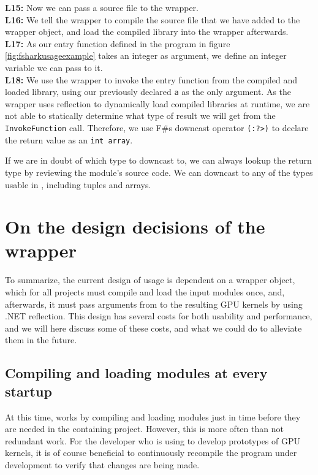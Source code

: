 \textbf{L15:} Now we can pass a source file to the \fshark{} wrapper. \\
\textbf{L16:} We tell the wrapper to compile the source file that we have added
to the wrapper object, and load the compiled library into the wrapper
afterwards.\\
\textbf{L17:} As our entry function defined in the program in figure
\ref{fig:fsharkusageexample} takes an integer as argument, we define an integer
variable we can pass to it.\\
\textbf{L18:} We use the wrapper to invoke the entry function from the compiled
and loaded library, using our previously declared \texttt{a} as the only
argument. As the \fshark{} wrapper uses reflection to dynamically load compiled
libraries at runtime, we are not able to statically determine what type of
result we will get from the \texttt{InvokeFunction} call. Therefore, we use F\#s
downcast operator \texttt{(:?>)} to declare the return value as an \texttt{int
  array}.

If we are in doubt of which type to downcast to, we can always lookup the return
type by reviewing the \fshark{} module's source code. We can downcast to any of
the types usable in \fsharp{}, including tuples and arrays.

\section{On the design decisions of the \fshark{} wrapper}
To summarize, the current design of \fshark{} usage is dependent on a
wrapper object, which for all \fshark{} projects must compile and load 
the input \fshark{} modules once, and, afterwards, it must pass arguments 
from \fsharp{} to the resulting GPU kernels by using .NET reflection.
This design has several costs for both usability and performance, and we will
here discuss some of these costs, and what we could do to alleviate them in the
future.

\subsection{Compiling and loading \fshark{} modules at every startup}
At this time, \fshark{} works by compiling and loading \fshark{} modules just in
time before they are needed in the containing \fsharp{} project. However, this
is more often than not redundant work. For the developer who is using \fshark{} to develop
prototypes of \fshark{} GPU kernels, it is of course beneficial to continuously
recompile the \fshark{} program under development to verify that changes are being
made.

